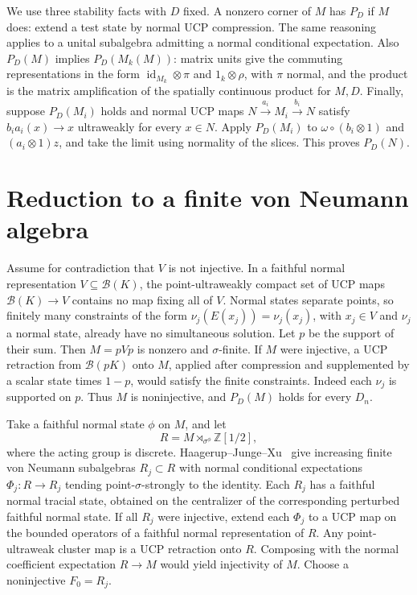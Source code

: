 \documentclass[11pt,a4paper]{article}
\begin{document}
We use three stability facts with \(D\) fixed. A nonzero corner of \(M\) has \(P_D\) if \(M\) does: extend a test state by normal UCP compression. The same reasoning applies to a unital subalgebra admitting a normal conditional expectation. Also \(P_D(M)\) implies \(P_D(M_k(M))\): matrix units give the commuting representations in the form \(\operatorname{id}_{M_k}\otimes\pi\) and \(1_k\otimes\rho\), with \(\pi\) normal, and the product is the matrix amplification of the spatially continuous product for \(M,D\). Finally, suppose \(P_D(M_i)\) holds and normal UCP maps \(N\xrightarrow{a_i}M_i\xrightarrow{b_i}N\) satisfy \(b_i a_i(x)\to x\) ultraweakly for every \(x\in N\). Apply \(P_D(M_i)\) to \(\omega\circ(b_i\otimes1)\) and \((a_i\otimes1)z\), and take the limit using normality of the slices. This proves \(P_D(N)\).

\section{Reduction to a finite von Neumann algebra}
Assume for contradiction that \(V\) is not injective. In a faithful normal representation \(V\subseteq\mathcal B(K)\), the point-ultraweakly compact set of UCP maps \(\mathcal B(K)\to V\) contains no map fixing all of \(V\). Normal states separate points, so finitely many constraints of the form \(\nu_j(E(x_j))=\nu_j(x_j)\), with \(x_j\in V\) and \(\nu_j\) a normal state, already have no simultaneous solution. Let \(p\) be the support of their sum. Then \(M=pVp\) is nonzero and \(\sigma\)-finite. If \(M\) were injective, a UCP retraction from \(\mathcal B(pK)\) onto \(M\), applied after compression and supplemented by a scalar state times \(1-p\), would satisfy the finite constraints. Indeed each \(\nu_j\) is supported on \(p\). Thus \(M\) is noninjective, and \(P_D(M)\) holds for every \(D_n\).

Take a faithful normal state \(\phi\) on \(M\), and let
\[
   R=M\rtimes_{\sigma^\phi} \mathbb Z[1/2],
\]
where the acting group is discrete. Haagerup--Junge--Xu~\cite[Theorem 2.1 and Lemmas 2.4(ii), 2.7]{hjx} give increasing finite von Neumann subalgebras \(R_j\subset R\) with normal conditional expectations \(\Phi_j:R\to R_j\) tending point-\(\sigma\)-strongly to the identity. Each \(R_j\) has a faithful normal tracial state, obtained on the centralizer of the corresponding perturbed faithful normal state. If all \(R_j\) were injective, extend each \(\Phi_j\) to a UCP map on the bounded operators of a faithful normal representation of \(R\). Any point-ultraweak cluster map is a UCP retraction onto \(R\). Composing with the normal coefficient expectation \(R\to M\) would yield injectivity of \(M\). Choose a noninjective \(F_0=R_j\).
\end{document}
